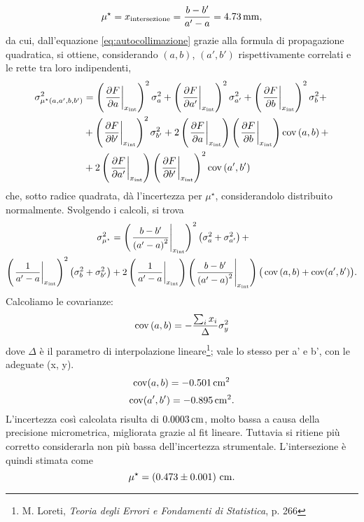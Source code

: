 \[ \mu ^{\star} = x_{\mathrm{intersezione}} = \frac{b - b'}{a' - a}  = 4.73 \,\mathrm{mm} , \]
da cui, dall'equazione \eqref{eq:autocollimazione} grazie alla formula di propagazione quadratica, si ottiene, considerando $\left(a, b\right)$, $\left(a', b'\right)$ rispettivamente correlati e le rette tra loro indipendenti,
\begin{equation*}
\begin{split} %
	\sigma^2_{\mu ^{\star}\left(a, a', b, b'\right)}  &= \left(\left.\frac{\partial F}{\partial a}\right|_{x_{\mathrm{int}}}\right)^2   \sigma^2_{a} + \left(\left.\frac{\partial F}{\partial a'}\right|_{x_{\mathrm{int}}}\right)^2   \sigma^2_{a'} + \left(\left.\frac{\partial F}{\partial b}\right|_{x_{\mathrm{int}}}\right)^2   \sigma^2_{b} +\\
								&+ \left(\left.\frac{\partial F}{\partial b'}\right|_{x_{\mathrm{int}}}\right)^2   \sigma^2_{b'} + 2\left(\left.\frac{\partial F}{\partial a}\right|_{x_{\mathrm{int}}}\right)\left(\left.\frac{\partial F}{\partial b}\right|_{x_{\mathrm{int}}}\right)   \cov\left(a, b\right) + \\
								&+ 2\left(\left.\frac{\partial F}{\partial a'}\right|_{x_{\mathrm{int}}}\right)\left(\left.\frac{\partial F}{\partial b'}\right|_{x_{\mathrm{int}}}\right)^2   \cov \left(a', b'\right)
\end{split}
\end{equation*}
che, sotto radice quadrata, d\`a l'incertezza per $ \mu ^{\star} $, considerandolo distribuito normalmente.
Svolgendo i calcoli, si trova
\begin{equation}
\begin{split}
\sigma^2_{\mu ^{\star}}  &=  \left(\left.\frac{b - b'}{\left(a' - a\right)^2}\right|_{x_{\mathrm{int}}}\right)^2 \left(\sigma^2_{a} + \sigma^2_{a'}\right) + \\ \left(\left.\frac{1}{a'- a}\right|_{x_{\mathrm{int}}}\right)^2   \left(\sigma^2_{b} + \sigma^2_{b'}\right)
							&+ 2 \left(\left.\frac{1}{a'- a}\right|_{x_{\mathrm{int}}}\right) \left(\left.\frac{b - b'}{\left(a' - a\right)^2}\right|_{x_{\mathrm{int}}}\right) \big(\operatorname{cov}\left(a, b\right) + \operatorname{cov}(a', b') \big).
\end{split}
\end{equation}
Calcoliamo le covarianze:
\[ \operatorname{cov}\left(a, b\right) = -\frac{\sum_{i} x_i}{\Delta}\sigma_y^2 \] 
dove $\Delta$ \`e il parametro di interpolazione lineare\footnote{M. Loreti, \textit{Teoria degli Errori e Fondamenti di Statistica}, p. 266}; vale lo stesso per a' e b', con le adeguate (x, y).
\[\operatorname{cov}(a, b) = -0.501 \,\mathrm{cm}^2 \] 
\[\operatorname{cov}(a', b') = -0.895 \,\mathrm{cm}^2. \]
L'incertezza cos\`i calcolata risulta di $0.0003\,\mathrm{cm}$, molto bassa a causa della precisione micrometrica, migliorata grazie al fit lineare. Tuttavia si ritiene pi\`u corretto considerarla non pi\`u bassa dell'incertezza strumentale. L'intersezione \`e quindi stimata come
\[ \mu ^{\star} =  \left(0.473 \pm 0.001\right) \,\mathrm{cm}. \] 


